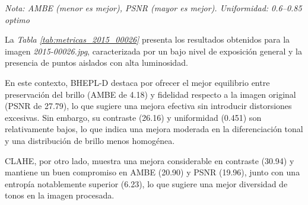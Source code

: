 \documentclass[sigchi]{acmart}
\begin{document}
\begin{table}[H]
	\centering
	\caption{Métricas de calidad para la imagen 2015\_00026.jpg}
	\label{tab:metricas_2015_00026}
	\vspace{0.5em}


	\vspace{0.5em}
	\footnotesize%
	\textit{Nota: AMBE (menor es mejor), PSNR (mayor es mejor). Uniformidad: 0.6–0.85 optimo}
\end{table}

La \emph{Tabla \ref{tab:metricas_2015_00026}} presenta los resultados obtenidos para la imagen
\emph{2015-00026.jpg}, caracterizada por un bajo nivel de exposición general y la presencia de puntos
aislados con alta luminosidad.

En este contexto, BHEPL-D destaca por ofrecer el mejor equilibrio entre preservación del brillo
(AMBE de 4.18) y fidelidad respecto a la imagen original (PSNR de 27.79), lo que sugiere una
mejora efectiva sin introducir distorsiones excesivas. Sin embargo, su contraste (26.16) y
uniformidad (0.451) son relativamente bajos, lo que indica una mejora moderada en la
diferenciación tonal y una distribución de brillo menos homogénea.

CLAHE, por otro lado, muestra una mejora considerable en contraste (30.94) y mantiene un buen
compromiso en AMBE (20.90) y PSNR (19.96), junto con una entropía notablemente superior (6.23),
lo que sugiere una mejor diversidad de tonos en la imagen procesada.
\end{document}

